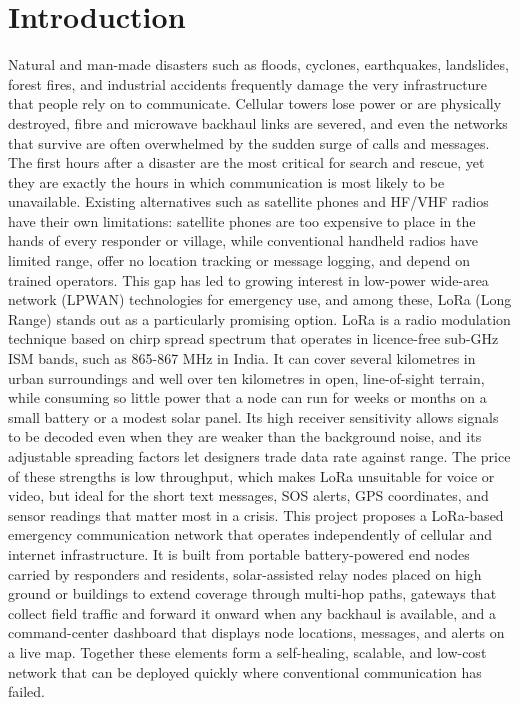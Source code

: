 \section{Introduction}
Natural and man-made disasters such as floods, cyclones, earthquakes, landslides, forest fires, and industrial accidents frequently damage the very infrastructure that people rely on to communicate. Cellular towers lose power or are physically destroyed, fibre and microwave backhaul links are severed, and even the networks that survive are often overwhelmed by the sudden surge of calls and messages. The first hours after a disaster are the most critical for search and rescue, yet they are exactly the hours in which communication is most likely to be unavailable. Existing alternatives such as satellite phones and HF/VHF radios have their own limitations: satellite phones are too expensive to place in the hands of every responder or village, while conventional handheld radios have limited range, offer no location tracking or message logging, and depend on trained operators. This gap has led to growing interest in low-power wide-area network (LPWAN) technologies for emergency use, and among these, LoRa (Long Range) stands out as a particularly promising option. LoRa is a radio modulation technique based on chirp spread spectrum that operates in licence-free sub-GHz ISM bands, such as 865-867 MHz in India. It can cover several kilometres in urban surroundings and well over ten kilometres in open, line-of-sight terrain, while consuming so little power that a node can run for weeks or months on a small battery or a modest solar panel. Its high receiver sensitivity allows signals to be decoded even when they are weaker than the background noise, and its adjustable spreading factors let designers trade data rate against range. The price of these strengths is low throughput, which makes LoRa unsuitable for voice or video, but ideal for the short text messages, SOS alerts, GPS coordinates, and sensor readings that matter most in a crisis. This project proposes a LoRa-based emergency communication network that operates independently of cellular and internet infrastructure. It is built from portable battery-powered end nodes carried by responders and residents, solar-assisted relay nodes placed on high ground or buildings to extend coverage through multi-hop paths, gateways that collect field traffic and forward it onward when any backhaul is available, and a command-center dashboard that displays node locations, messages, and alerts on a live map. Together these elements form a self-healing, scalable, and low-cost network that can be deployed quickly where conventional communication has failed.
